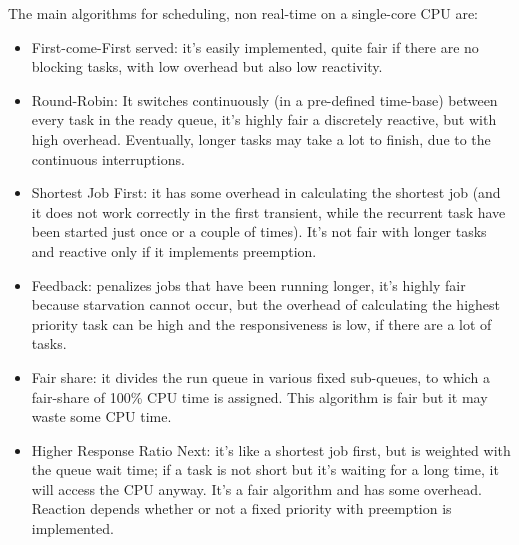 The main algorithms for scheduling, non real-time on a single-core CPU are:
\begin{itemize}
	\item First-come-First served: it's easily implemented, quite fair if there are no blocking tasks, with low overhead but also low reactivity.
	\item Round-Robin: It switches continuously (in a pre-defined time-base) between every task in the ready queue, it's highly fair a discretely reactive, but with high overhead. Eventually, longer tasks may take a lot to finish, due to the continuous interruptions.
	\item Shortest Job First: it has some overhead in calculating the shortest job (and it does not work correctly in the first transient, while the recurrent task have been started just once or a couple of times). It's not fair with longer tasks and reactive only if it implements preemption.
	\item Feedback: penalizes jobs that have been running longer, it's highly fair because starvation cannot occur, but the overhead of calculating the highest priority task can be high and the responsiveness is low, if there are a lot of tasks.
	\item Fair share: it divides the run queue in various fixed sub-queues, to which a fair-share of 100\% CPU time is assigned. This algorithm is fair but it may waste some CPU time. 
	\item Higher Response Ratio Next: it's like a shortest job first, but is weighted with the queue wait time; if a task is not short but it's waiting for a long time, it will access the CPU anyway. It's a fair algorithm and has some overhead. Reaction depends whether or not a fixed priority with preemption is implemented.
\end{itemize}


